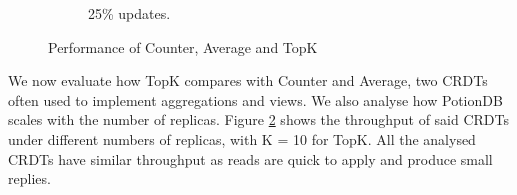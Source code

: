 \documentclass[sigplan,review,anonymous]{acmart}
\begin{document}
\begin{figure}
\begin{subfigure}{.34\linewidth}
	\caption{25\% updates.}
	\label{fig:crdts_25-upd}
	\end{subfigure}%
	\vspace*{-0.65em}
	\caption{Performance of Counter, Average and TopK}
	\label{fig:crdts}
	\vspace*{-0.8em}
\end{figure}

We now evaluate how TopK compares with Counter and Average, two CRDTs often used to implement aggregations and views.
We also analyse how PotionDB scales with the number of replicas.
Figure \ref{fig:crdts} shows the throughput of said CRDTs under different numbers of replicas, with K = 10 for TopK.
All the analysed CRDTs have similar throughput as reads are quick to apply and produce small replies.

\end{document}

